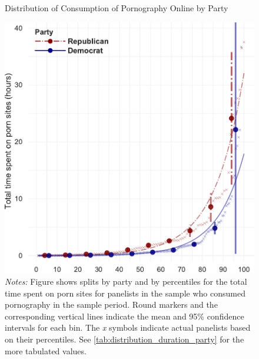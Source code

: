 \documentclass[12pt, letterpaper]{article}
\begin{document}
\begin{figure}[ht]
	\centering
	\caption{Distribution of Consumption of Pornography Online by Party}
	\includegraphics[width=.6\linewidth]{../figs/distribution_duration_on_adultsites_by_party.pdf}
	\caption*{\footnotesize \emph{Notes:} 
		Figure shows splits by party and by percentiles for the total time spent on porn sites for panelists in the sample who consumed pornography in the sample period.
		Round markers and the corresponding vertical lines indicate the mean and 95\% confidence intervals for each bin.
		The \emph{x} symbols indicate actual panelists based on their percentiles.
		See \cref{tab:distribution_duration_party} for the more tabulated values.
	}
	\label{fig:distribution_duration_party}
\end{figure}
\end{document}
